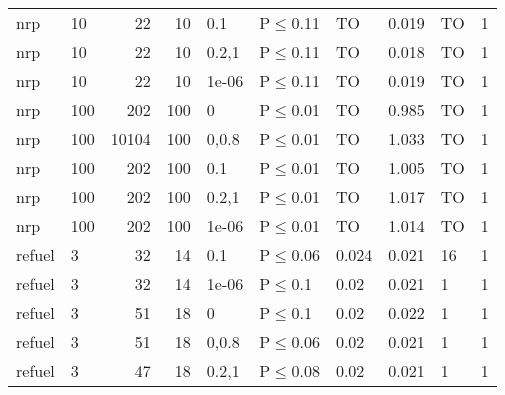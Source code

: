\begin{longtable}{llrrllllll}
 nrp           & 10        &     	22 &  10 & 0.1   & P$\leq$0.11  & TO      & 0.019   & TO      & 1    \\
 nrp           & 10        &     	22 &  10 & 0.2,1 & P$\leq$0.11  & TO      & 0.018   & TO      & 1    \\
 nrp           & 10        &     	22 &  10 & 1e-06 & P$\leq$0.11  & TO      & 0.019   & TO      & 1    \\
 nrp           & 100       &    	202 & 100 & 0     & P$\leq$0.01  & TO      & 0.985   & TO      & 1    \\
 nrp           & 100       &  	10104 & 100 & 0,0.8 & P$\leq$0.01  & TO      & 1.033   & TO      & 1    \\
 nrp           & 100       &    	202 & 100 & 0.1   & P$\leq$0.01  & TO      & 1.005   & TO      & 1    \\
 nrp           & 100       &    	202 & 100 & 0.2,1 & P$\leq$0.01  & TO      & 1.017   & TO      & 1    \\
 nrp           & 100       &    	202 & 100 & 1e-06 & P$\leq$0.01  & TO      & 1.014   & TO      & 1    \\
 refuel        & 3         &     	32 &  14 & 0.1   & P$\leq$0.06  & 0.024   & 0.021   & 16      & 1    \\
 refuel        & 3         &     	32 &  14 & 1e-06 & P$\leq$0.1   & 0.02    & 0.021   & 1       & 1    \\
 refuel        & 3         &     	51 &  18 & 0     & P$\leq$0.1   & 0.02    & 0.022   & 1       & 1    \\
 refuel        & 3         &     	51 &  18 & 0,0.8 & P$\leq$0.06  & 0.02    & 0.021   & 1       & 1    \\
 refuel        & 3         &     	47 &  18 & 0.2,1 & P$\leq$0.08  & 0.02    & 0.021   & 1       & 1    \\
\bottomrule
\end{longtable}
